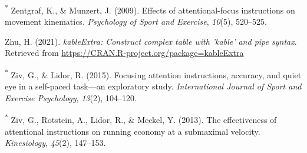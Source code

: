 \documentclass[
  man, donotrepeattitle,floatsintext]{apa7}
\newlength{\cslhangindent}
\newlength{\cslentryspacingunit} %
\newenvironment{CSLReferences}[2] %
 {%
  \setlength{\parindent}{0pt}
  \ifodd #1
  \let\oldpar\par
  \def\par{\hangindent=\cslhangindent\oldpar}
  \fi
  \setlength{\parskip}{#2\cslentryspacingunit}
 }%
 {}
\begin{document}
\begin{CSLReferences}{1}{0}
\leavevmode{}%
\textsuperscript{*} Zentgraf, K., \& Munzert, J. (2009). Effects of attentional-focus instructions on movement kinematics. \emph{Psychology of Sport and Exercise}, \emph{10}(5), 520--525.

\leavevmode{}%
Zhu, H. (2021). \emph{kableExtra: Construct complex table with 'kable' and pipe syntax}. Retrieved from \url{https://CRAN.R-project.org/package=kableExtra}

\leavevmode{}%
\textsuperscript{*} Ziv, G., \& Lidor, R. (2015). Focusing attention instructions, accuracy, and quiet eye in a self-paced task---an exploratory study. \emph{International Journal of Sport and Exercise Psychology}, \emph{13}(2), 104--120.

\leavevmode{}%
\textsuperscript{*} Ziv, G., Rotstein, A., Lidor, R., \& Meckel, Y. (2013). The effectiveness of attentional instructions on running economy at a submaximal velocity. \emph{Kinesiology}, \emph{45}(2), 147--153.

\end{CSLReferences}
\end{document}
